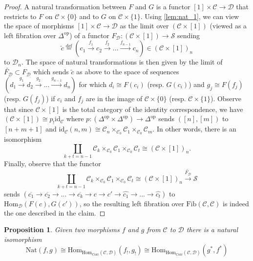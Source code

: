 \documentclass[a4paper, reqno]{amsart}
\newtheorem{prop}[theorem]{Proposition}
\theoremstyle{definition}
\newcommand\cC{\mathscr C}
\newcommand\cD{\mathscr D}
\newcommand\cS{\mathscr S}
\newcommand\id{\mathrm{id}}
\newcommand\mor{\mathrm{Hom}}
\newcommand\nat{\mathrm{Nat}}
\newcommand\op{\mathrm{op}}
\newcommand\bydef{\overset{\mathrm{def}}{=}}
\newcommand\fib{\mathrm{Fib}}
\begin{document}
\begin{proof}
A natural transformation between $F$ and $G$ is a functor $[1]\times\cC\rightarrow\cD$ that restricts to $F$ on $\cC\times\{0\}$ and to $G$ on $\cC\times\{1\}$. Using \cref{lem:nat_1}, we can view the space of morphisms $[1]\times\cC\rightarrow\cD$ as the limit over $(\cC\times[1])$ (viewed as a left fibration over $\Delta^\op$) of a functor  $F_\cD:(\cC\times[1])\rightarrow\cS$ sending 
\[\widetilde{c}\bydef(c_1\xrightarrow{f_1} c_2\xrightarrow{f_2}...\xrightarrow{f_{n-1}} c_n)\in(\cC\times[1])_n\]
to $\cD_n$. The space of natural transformations is then given by the limit of $\widetilde{F_\cD}\subset F_\cD$ which sends $\widetilde{c}$ as above to the space of sequences $(d_1\xrightarrow{g_1}d_2\xrightarrow{g_2}...\xrightarrow{g_{n-1}}d_n)$ for which $d_i\cong F(c_i)$ (resp. $G(c_i)$) and $g_j\cong F(f_j)$ (resp. $G(f_j)$) if $c_i$ and $f_j$ are in the image of $\cC\times\{0\}$ (resp. $\cC\times\{1\}$). Observe that since $\cC\times[1]$ is the total category of the identity correspondence, we have $(\cC\times[1])\cong p_!\id_\cC$ where $p:(\Delta^\op\times\Delta^\op)\rightarrow\Delta^\op$ sends $([n],[m])$ to $[n+m+1]$ and $\id_\cC(n,m)\cong \cC_n\times_{\cC_0}\cC_1\times_{\cC_0}\cC_m$. In other words, there is an isomorphism
\[\coprod_{k+t=n-1}\cC_k\times_{\cC_0}\cC_1\times_{\cC_0}\cC_t\cong (\cC\times[1])_n.\]
Finally, observe that the functor
\[\coprod_{k+t=n-1}\cC_k\times_{\cC_0}\cC_1\times_{\cC_0}\cC_t\cong (\cC\times[1])_n\xrightarrow{\widetilde{F_\cD}}\cS\]
sends $(\overline{c_1}\rightarrow\overline{c_2}\rightarrow...\rightarrow\overline{c_k}\rightarrow c\rightarrow c'\rightarrow\widehat{c_1}\rightarrow...\rightarrow\widehat{c_t})$ to $\mor_\cD(F(c),G(c'))$, so the resulting left fibration over $\fib(\cC,\cC)$ is indeed the one described in the claim.
\end{proof}
\begin{prop}\label{prop:corr_bicat}
Given two morphisms $f$ and $g$ from $\cC$ to $\cD$ there is a natural isomorphism
\[\nat(f,g)\cong\mor_{\mor_{\mathrm{Corr}}(\cC,\cD)}(f_!,g_!)\cong\mor_{\mor_{\mathrm{Corr}}(\cC,\cD)}(g^*,f^*)\]
\end{prop}
\end{document}
